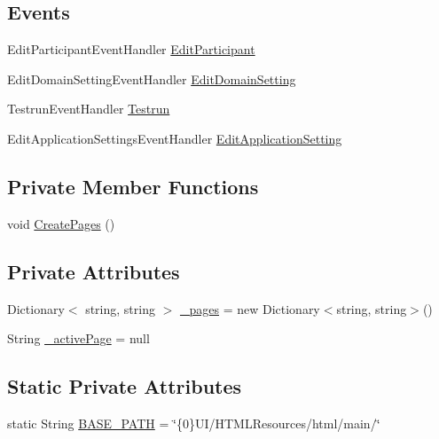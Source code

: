 \subsection*{Events}
\begin{DoxyCompactItemize}
\item 
Edit\+Participant\+Event\+Handler \hyperlink{class_web_analyzer_1_1_u_i_1_1_interaction_objects_1_1_navigation_adc0aa816457297571e9dd44ffe09a372}{Edit\+Participant}
\item 
Edit\+Domain\+Setting\+Event\+Handler \hyperlink{class_web_analyzer_1_1_u_i_1_1_interaction_objects_1_1_navigation_ae2d3e814d1fdf232f7443507bb5772e8}{Edit\+Domain\+Setting}
\item 
Testrun\+Event\+Handler \hyperlink{class_web_analyzer_1_1_u_i_1_1_interaction_objects_1_1_navigation_a34448e99688e6e15b470a981a86a4bba}{Testrun}
\item 
Edit\+Application\+Settings\+Event\+Handler \hyperlink{class_web_analyzer_1_1_u_i_1_1_interaction_objects_1_1_navigation_a640f19a0ee9d1c022c0cab2aacf53eec}{Edit\+Application\+Setting}
\end{DoxyCompactItemize}
\subsection*{Private Member Functions}
\begin{DoxyCompactItemize}
\item 
void \hyperlink{class_web_analyzer_1_1_u_i_1_1_interaction_objects_1_1_navigation_ac56e103343a7667fe4bab5e449c0942f}{Create\+Pages} ()
\end{DoxyCompactItemize}
\subsection*{Private Attributes}
\begin{DoxyCompactItemize}
\item 
Dictionary$<$ string, string $>$ \hyperlink{class_web_analyzer_1_1_u_i_1_1_interaction_objects_1_1_navigation_a57f8147fa5872f86185947f634e43c5e}{\+\_\+pages} = new Dictionary$<$string, string$>$()
\item 
String \hyperlink{class_web_analyzer_1_1_u_i_1_1_interaction_objects_1_1_navigation_afd0cf0210ac23b764bf332e97f332ee9}{\+\_\+active\+Page} = null
\end{DoxyCompactItemize}
\subsection*{Static Private Attributes}
\begin{DoxyCompactItemize}
\item 
static String \hyperlink{class_web_analyzer_1_1_u_i_1_1_interaction_objects_1_1_navigation_a2562597149b4eb0542349a2afb17b7e1}{B\+A\+S\+E\+\_\+\+P\+A\+T\+H} = \char`\"{}\{0\}U\+I/H\+T\+M\+L\+Resources/html/main/\char`\"{}
\end{DoxyCompactItemize}
